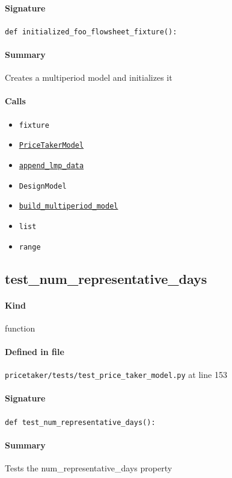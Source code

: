 \documentclass[11pt]{report}
\begin{document}
\paragraph{Signature} \texttt{def initialized\_foo\_flowsheet\_fixture():}
\paragraph{Summary} Creates a multiperiod model and initializes it
\paragraph{Calls}
\begin{itemize}[leftmargin=*]
  \item \texttt{fixture}
  \item \hyperref[def:pricetaker-price_taker_model.py:PriceTakerModel:L161]{\texttt{PriceTakerModel}}
  \item \hyperref[def:pricetaker-price_taker_model.py:PriceTakerModel.append_lmp_data:L221]{\texttt{append\_lmp\_data}}
  \item \texttt{DesignModel}
  \item \hyperref[def:pricetaker-price_taker_model.py:PriceTakerModel.build_multiperiod_model:L291]{\texttt{build\_multiperiod\_model}}
  \item \texttt{list}
  \item \texttt{range}
\end{itemize}
\subsection{test\_num\_representative\_days}
\label{def:pricetaker-tests-test_price_taker_model.py:test_num_representative_days:L153}
\paragraph{Kind} function
\paragraph{Defined in file} \texttt{pricetaker/tests/test\_price\_taker\_model.py} at line 153
\paragraph{Signature} \texttt{def test\_num\_representative\_days():}
\paragraph{Summary} Tests the num\_representative\_days property
\end{document}
